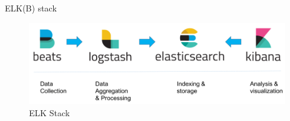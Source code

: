 \documentclass[compress,aspectratio=169]{beamer}
\begin{document}
\begin{frame}{ELK(B) stack}
\begin{center}
\begin{figure}
  \includegraphics[width=\textwidth]{elk.png}
  \caption{ELK Stack}
\end{figure}
\end{center}
\end{frame}
\end{document}
